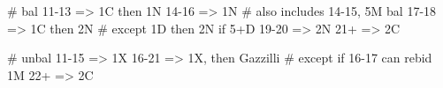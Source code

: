 # bal
11-13 => 1C then 1N
14-16 => 1N          # also includes 14-15, 5M bal
17-18 => 1C then 2N  # except 1D then 2N if 5+D
19-20 => 2N
21+   => 2C

# unbal
11-15 => 1X
16-21 => 1X, then Gazzilli  # except if 16-17 can rebid 1M
22+   => 2C